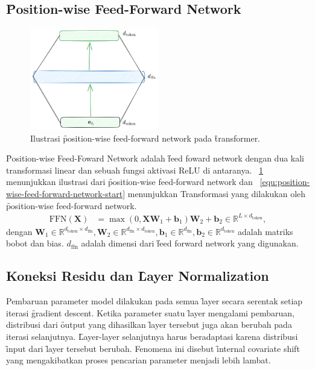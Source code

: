 \subsection{\f{Position-wise Feed-Forward Network}}
	\begin{figure}[!ht]
		\centering
		\includegraphics[width=0.5\textwidth]{assets/pics/ffn_transformer.png}
		\caption{Ilustrasi \f{position-wise feed-forward network} pada \f{transformer}.}
		\label{fig:position-wise-feed-forward-network}
	\end{figure}
	\f{Position-wise Feed-Foward Network} adalah \f{feed foward network} dengan dua kali transformasi linear dan sebuah fungsi aktivasi ReLU di antaranya. \pic~\ref{fig:position-wise-feed-forward-network} menunjukkan ilustrasi dari \f{position-wise feed-forward network} dan \equ~\ref{equ:position-wise-feed-forward-network-start} menunjukkan Transformasi yang dilakukan oleh \f{position-wise feed-forward network}.
	\begin{align}
		\label{equ:position-wise-feed-forward-network-start}
		\text{FFN}(\mathbf{X}) &= \max(0, \mathbf{X}\mathbf{W}_1 + \mathbf{b}_1)\mathbf{W}_2 + \mathbf{b}_2 \in \mathbb{R}^{L \times d_{\text{token}}},
	\end{align}
	dengan $\mathbf{W}_1 \in \mathbb{R}^{d_{\text{token}} \times d_{\text{ffn}}}, \mathbf{W}_2 \in \mathbb{R}^{d_{\text{ffn}} \times d_{\text{token}}}, \mathbf{b}_1 \in \mathbb{R}^{d_{\text{ffn}}}, \mathbf{b}_2 \in \mathbb{R}^{d_{\text{token}}}$ adalah matriks bobot dan bias. $d_{\text{ffn}}$ adalah dimensi dari \f{feed forward network} yang digunakan.

	\subsection{Koneksi Residu dan \f{Layer Normalization}}
	\label{sec:layer-normalization}

	Pembaruan parameter model dilakukan pada semua \f{layer} secara serentak setiap iterasi \f{gradient descent}. Ketika parameter suatu \f{layer} mengalami pembaruan, distribusi dari \f{output} yang dihasilkan \f{layer} tersebut juga akan berubah pada iterasi selanjutnya. \f{Layer-layer} selanjutnya harus beradaptasi karena distribusi \f{input} dari \f{layer} tersebut berubah. Fenomena ini disebut \f{internal covariate shift} yang mengakibatkan proses pencarian parameter menjadi lebih lambat.
	
